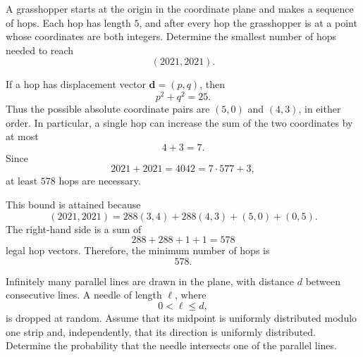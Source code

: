     \begin{expectedproblem}[2021 Putnam]
        A grasshopper starts at the origin in the coordinate plane and makes a
        sequence of hops. Each hop has length $5$, and after every hop the
        grasshopper is at a point whose coordinates are both integers.
        Determine the smallest number of hops needed to reach
        \[
            (2021,2021).
        \]
    \end{expectedproblem}

    \begin{solution}
        If a hop has displacement vector $\mathbf{d}=(p,q)$, then
        \[
            p^2+q^2=25.
        \]
        Thus the possible absolute coordinate pairs are $(5,0)$ and $(4,3)$,
        in either order. In particular, a single hop can increase the sum of
        the two coordinates by at most
        \[
            4+3=7.
        \]
        Since
        \[
            2021+2021=4042=7\cdot577+3,
        \]
        at least $578$ hops are necessary.

        This bound is attained because
        \[
            (2021,2021)
            =
            288(3,4)+288(4,3)+(5,0)+(0,5).
        \]
        The right-hand side is a sum of
        \[
            288+288+1+1=578
        \]
        legal hop vectors. Therefore, the minimum number of hops is
        \[
            \boxed{578}.
        \]
    \end{solution}

    \begin{expectedproblem}
        Infinitely many parallel lines are drawn in the plane, with distance
        $d$ between consecutive lines. A needle of length $\ell$, where
        \[
            0<\ell\leq d,
        \]
        is dropped at random. Assume that its midpoint is uniformly
        distributed modulo one strip and, independently, that its direction is
        uniformly distributed. Determine the probability that the needle
        intersects one of the parallel lines.
    \end{expectedproblem}


